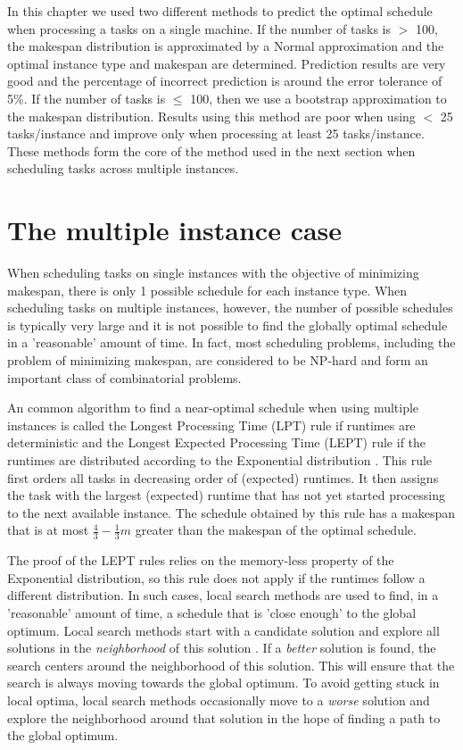 \documentclass[12pt]{report}
\begin{document}
In this chapter we used two different methods to predict the optimal schedule when processing a tasks on a single machine. 
If the number of tasks is $>$ 100, the makespan distribution is approximated by a Normal approximation and the optimal instance type and makespan are determined. 
Prediction results are very good and the percentage of incorrect prediction is around the error tolerance of 5\%. 
If the number of tasks is $\leq$ 100, then we use a bootstrap approximation to the makespan distribution. 
Results using this method are poor when using $<$ 25 tasks/instance and improve only when processing at least 25 tasks/instance.
These methods form the core of the method used in the next section when scheduling tasks across multiple instances.

\chapter{The multiple instance case}

When scheduling tasks on single instances with the objective of minimizing makespan, there is only 1 possible schedule for each instance type.
When scheduling tasks on multiple instances, however, the number of possible schedules is typically very large and it is not possible to find the globally optimal schedule in a 'reasonable' amount of time.
In fact, most scheduling problems, including the problem of minimizing makespan, are considered to be NP-hard \cite{Garey1979} and form an important class of combinatorial problems.

An common algorithm to find a near-optimal schedule when using multiple instances is called the Longest Processing Time (LPT) rule if runtimes are deterministic and the Longest Expected Processing Time (LEPT) rule if the runtimes are distributed according to the Exponential distribution \cite{Pinedo2012}. 
This rule first orders all tasks in decreasing order of (expected) runtimes.
It then assigns the task with the largest (expected) runtime that has not yet started processing to the next available instance. 
The schedule obtained by this rule has a makespan that is at most $\frac{4}{3} - \frac{1}{3}m$ greater than the makespan of the optimal schedule.

The proof of the LEPT rules relies on the memory-less property of the Exponential distribution, so this rule does not apply if the runtimes follow a different distribution.
In such cases, local search methods are used to find, in a 'reasonable' amount of time, a schedule that is 'close enough' to the global optimum.
Local search methods start with a candidate solution and explore all solutions in the \textit{neighborhood} of this solution \cite{Glass1994}.
If a \textit{better} solution is found, the search centers around the neighborhood of this solution.
This will ensure that the search is always moving towards the global optimum.
To avoid getting stuck in local optima, local search methods occasionally move to a \textit{worse} solution and explore the neighborhood around that solution in the hope of finding a path to the global optimum.
\end{document}
